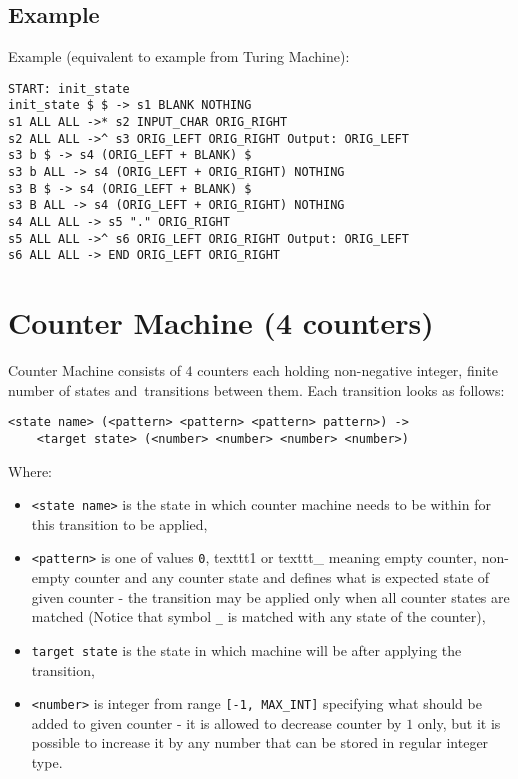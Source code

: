 \documentclass[english,shortabstract,mgr]{iithesis}
\begin{document}
\subsection{Example}

Example (equivalent to example from Turing Machine):
\begin{verbatim}
START: init_state
init_state $ $ -> s1 BLANK NOTHING
s1 ALL ALL ->* s2 INPUT_CHAR ORIG_RIGHT
s2 ALL ALL ->^ s3 ORIG_LEFT ORIG_RIGHT Output: ORIG_LEFT
s3 b $ -> s4 (ORIG_LEFT + BLANK) $
s3 b ALL -> s4 (ORIG_LEFT + ORIG_RIGHT) NOTHING
s3 B $ -> s4 (ORIG_LEFT + BLANK) $
s3 B ALL -> s4 (ORIG_LEFT + ORIG_RIGHT) NOTHING
s4 ALL ALL -> s5 "." ORIG_RIGHT
s5 ALL ALL ->^ s6 ORIG_LEFT ORIG_RIGHT Output: ORIG_LEFT
s6 ALL ALL -> END ORIG_LEFT ORIG_RIGHT
\end{verbatim}

\section {Counter Machine (4 counters)}

Counter Machine consists of $4$ counters each holding non-negative integer,
finite number of states and~transitions between them. Each transition
looks as follows:

\begin{verbatim}
<state name> (<pattern> <pattern> <pattern> pattern>) ->
    <target state> (<number> <number> <number> <number>)
\end{verbatim}

Where:
\begin{itemize}
  \item \texttt{<state name>} is the state in which counter machine needs to be
      within for this transition to be applied,
  \item \texttt{<pattern>} is one of values \texttt{0}, texttt{1} or texttt{\_}
      meaning empty counter, non-empty counter and any counter state and defines
      what is expected state of given counter - the transition may be applied
      only when all counter states are matched (Notice that symbol \texttt{\_}
      is matched with any state of the counter),
  \item \texttt{target state} is the state in which machine will be after
      applying the transition,
  \item \texttt{<number>} is integer from range \texttt{[-1, MAX\_INT]} specifying
      what should be added to given counter - it is allowed to decrease counter
      by $1$ only, but it is possible to increase it by any number that can be stored
      in regular integer type.
\end{itemize}
\end{document}
